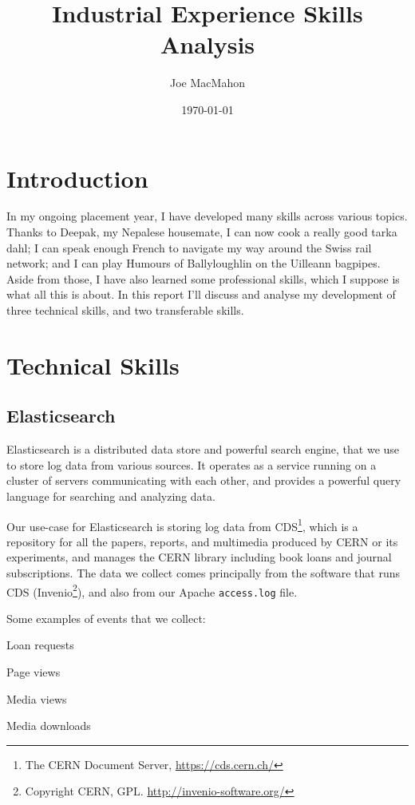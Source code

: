 \documentclass[a4paper,11pt]{article} %
\title{Industrial Experience Skills Analysis}
\author{Joe MacMahon}
\date{\today}
\begin{document}
\maketitle

\section{Introduction}
\label{sec:intro}
In my ongoing placement year, I have developed many skills across various topics.  Thanks to Deepak, my Nepalese housemate, I can now cook a really good tarka dahl; I can speak enough French to navigate my way around the Swiss rail network; and I can play Humours of Ballyloughlin on the Uilleann bagpipes.  Aside from those, I have also learned some professional skills, which I suppose is what all this is about.  In this report I'll discuss and analyse my development of three technical skills, and two transferable skills.

\section{Technical Skills}
\label{sec:technical}

\subsection{Elasticsearch}
\label{sec:technical.elasticsearch}

Elasticsearch is a distributed data store and powerful search engine, that we use to store log data from various sources.  It operates as a service running on a cluster of servers communicating with each other, and provides a powerful query language for searching and analyzing data.

Our use-case for Elasticsearch is storing log data from CDS\footnote{The CERN Document Server, \url{https://cds.cern.ch/}}, which is a repository for all the papers, reports, and multimedia produced by CERN or its experiments, and manages the CERN library including book loans and journal subscriptions.  The data we collect comes principally from the software that runs CDS (Invenio\footnote{Copyright CERN, GPL.  \url{http://invenio-software.org/}}), and also from our Apache \texttt{access.log} file.

Some examples of events that we collect:
\begin{itemize*}
\item Loan requests
\item Page views
\item Media views
\item Media downloads
\end{itemize*}
\end{document}
